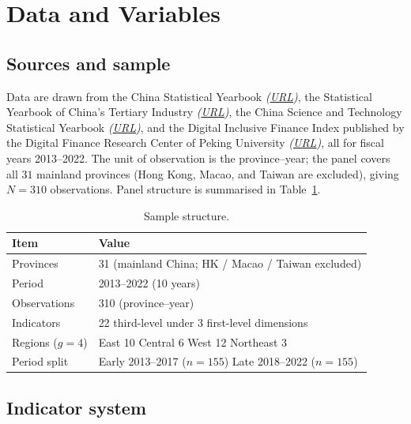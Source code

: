 \documentclass[12pt,letterpaper]{article}
\begin{document}
\section{Data and Variables}\label{sec:data}

\subsection{Sources and sample}

Data are drawn from the {China Statistical Yearbook} \textit{(\href{https://www.stats.gov.cn/english/Statisticaldata/yearbook/}{URL})}, the
{Statistical Yearbook of China's Tertiary Industry} \textit{(\href{http://www.tjcn.org/e/search/result/?searchid=1257}{URL})}, the {China Science and Technology Statistical Yearbook} \textit{(\href{https://www.tjnj.net/yearbookbyarea/china}{URL})}, and the Digital Inclusive Finance Index published by the Digital Finance Research Center of Peking University \textit{(\href{https://idf.pku.edu.cn/zsbz/bjdxszphjrzs/index.htm}{URL})}, all for fiscal years 2013--2022. The unit of observation is the province--year; the panel covers all $31$ mainland provinces (Hong Kong, Macao, and Taiwan are excluded), giving
$N = 310$ observations.  Panel structure is summarised in Table~\ref{tab:sample}.

\begin{table}[H]
\centering
\caption{Sample structure.}\label{tab:sample}
\begin{tabular}{l l}
\toprule
\textbf{Item} & \textbf{Value} \\
\midrule
Provinces            & 31 (mainland China; HK / Macao / Taiwan excluded) \\
Period               & 2013--2022 (10 years) \\
Observations         & 310 (province--year) \\
Indicators           & 22 third-level under 3 first-level dimensions \\
Regions ($g=4$)      & East 10 \quad Central 6 \quad West 12 \quad Northeast 3 \\
Period split         & Early 2013--2017 ($n=155$) \quad Late 2018--2022 ($n=155$)\\
\bottomrule
\end{tabular}
\end{table}

\subsection{Indicator system}
\end{document}
